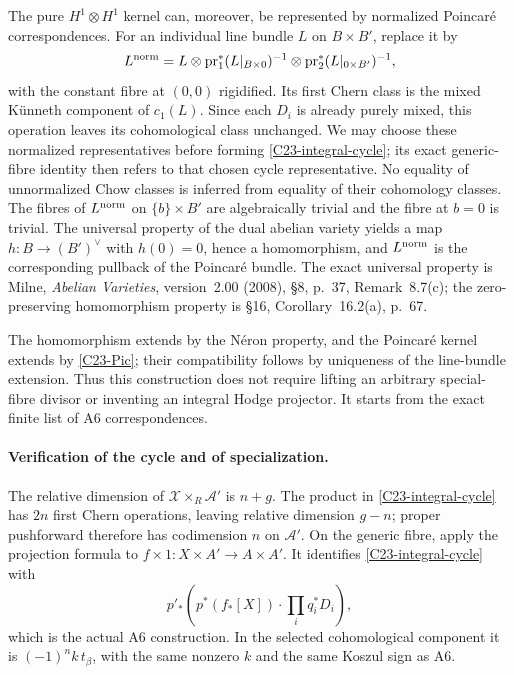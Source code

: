 The pure $H^1\otimes H^1$ kernel can, moreover, be represented
by normalized Poincar\'e correspondences.
For an individual line bundle $L$ on $B\times B'$, replace it by
\[
 L^{\rm norm}=L\otimes
       \operatorname{pr}_1^*(L|_{B\times0})^{-1}
       \otimes\operatorname{pr}_2^*(L|_{0\times B'})^{-1},
\]
with the constant fibre at $(0,0)$ rigidified.
Its first Chern class is the mixed K\"unneth component of
$c_1(L)$.  Since each $D_i$ is already purely mixed, this
operation leaves its cohomological class unchanged.
We may choose these normalized representatives before forming
\eqref{C23-integral-cycle}; its exact generic-fibre identity
then refers to that chosen cycle representative.  No equality
of unnormalized Chow classes is inferred from equality of
their cohomology classes.
The fibres of $L^{\rm norm}$ on $\{b\}\times B'$ are
algebraically trivial and the fibre at $b=0$ is trivial.
The universal property of the dual abelian variety yields
a map $h:B\to(B')^\vee$ with $h(0)=0$, hence a homomorphism,
and $L^{\rm norm}$ is the corresponding pullback of the
Poincar\'e bundle.  The exact universal property is Milne,
\emph{Abelian Varieties}, version~2.00 (2008), \S8,
p.~37, Remark~8.7(c); the zero-preserving homomorphism
property is \S16, Corollary~16.2(a), p.~67.

The homomorphism extends by the N\'eron property, and the
Poincar\'e kernel extends by \eqref{C23-Pic}; their compatibility
follows by uniqueness of the line-bundle extension.
Thus this construction does not require lifting an arbitrary
special-fibre divisor or inventing an integral Hodge projector.
It starts from the exact finite list of A6 correspondences.

\paragraph{Verification of the cycle and of specialization.}
The relative dimension of $\mathcal X\times_R\mathcal A'$
is $n+g$.  The product in \eqref{C23-integral-cycle} has
$2n$ first Chern operations, leaving relative dimension
$g-n$; proper pushforward therefore has codimension $n$
on $\mathcal A'$.
On the generic fibre, apply the projection formula to
$f\times1:X\times A'\to A\times A'$.
It identifies \eqref{C23-integral-cycle} with
\[
 p'_*(p^*(f_*[X])\cdot\prod_iq_i^*D_i),
\]
which is the actual A6 construction.  In the selected
cohomological component it is $(-1)^n k\,t_\beta$, with
the same nonzero $k$ and the same Koszul sign as A6.

